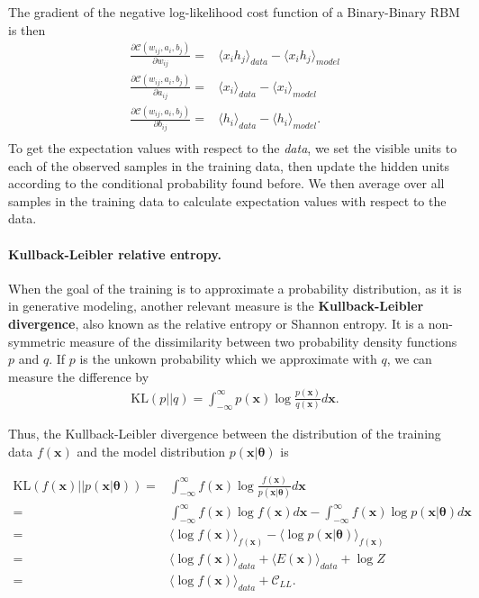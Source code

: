 \documentclass[%
oneside,                 %
final,                   %
10pt]{article}
\begin{document}
The gradient of the negative log-likelihood cost function of a Binary-Binary RBM is then
\begin{align}
	\frac{\partial \mathcal{C} (w_{ij}, a_i, b_j)}{\partial w_{ij}} =& \langle x_i h_j \rangle_{data} - \langle x_i h_j \rangle_{model} \\
	\frac{\partial \mathcal{C} (w_{ij}, a_i, b_j)}{\partial a_{ij}} =& \langle x_i \rangle_{data} - \langle x_i \rangle_{model} \\
	\frac{\partial \mathcal{C} (w_{ij}, a_i, b_j)}{\partial b_{ij}} =& \langle h_i \rangle_{data} - \langle h_i \rangle_{model}. \\
\end{align}
To get the expectation values with respect to the \emph{data}, we set the visible units to each of the observed samples in the training data, then update the hidden units according to the conditional probability found before. We then average over all samples in the training data to calculate expectation values with respect to the data. 

\paragraph{Kullback-Leibler relative entropy.}
When the goal of the training is to approximate a probability
distribution, as it is in generative modeling, another relevant
measure is the \textbf{Kullback-Leibler divergence}, also known as the
relative entropy or Shannon entropy. It is a non-symmetric measure of the
dissimilarity between two probability density functions $p$ and
$q$. If $p$ is the unkown probability which we approximate with $q$,
we can measure the difference by
\begin{align}
	\text{KL}(p||q) = \int_{-\infty}^{\infty} p (\bm{x}) \log \frac{p(\bm{x})}{q(\bm{x})}  d\bm{x}.
\end{align}

Thus, the Kullback-Leibler divergence between the distribution of the
training data $f(\bm{x})$ and the model distribution $p(\bm{x}|
\bm{\theta})$ is

\begin{align}
	\text{KL} (f(\bm{x})|| p(\bm{x}| \bm{\theta})) =& \int_{-\infty}^{\infty}
	f (\bm{x}) \log \frac{f(\bm{x})}{p(\bm{x}| \bm{\theta})} d\bm{x} \\
	=& \int_{-\infty}^{\infty} f(\bm{x}) \log f(\bm{x}) d\bm{x} - \int_{-\infty}^{\infty} f(\bm{x}) \log
	p(\bm{x}| \bm{\theta}) d\bm{x} \\
	=& \langle \log f(\bm{x}) \rangle_{f(\bm{x})} - \langle \log p(\bm{x}| \bm{\theta}) \rangle_{f(\bm{x})} \\
	=& \langle \log f(\bm{x}) \rangle_{data} + \langle E(\bm{x}) \rangle_{data} + \log Z \\
	=& \langle \log f(\bm{x}) \rangle_{data} + \mathcal{C}_{LL} .
\end{align}
\end{document}
